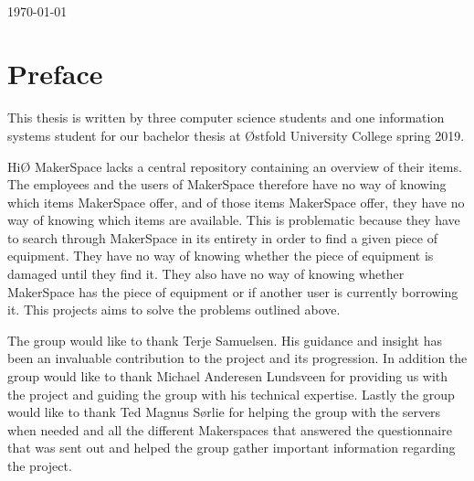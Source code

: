 \documentclass[12pt]{report}
\begin{document}
\begin{titlepage}
\begin{minipage}{0.8\textwidth}
\end{minipage}\\[2cm]



{\large \today}\\[2cm] %

\vfill %

\end{titlepage}

\makepresentationpage
{}


\chapter*{Preface}

This thesis is written by three computer science students and one information systems student for our bachelor thesis at Østfold University College spring 2019.

HiØ MakerSpace lacks a central repository containing an overview of their items.
The employees and the users of MakerSpace therefore have no way of knowing which items MakerSpace offer, and of those items MakerSpace offer, they have no way of knowing which items are available.
This is problematic because they have to search through MakerSpace in its entirety in order to find a given piece of equipment.
They have no way of knowing whether the piece of equipment is damaged until they find it.
They also have no way of knowing whether MakerSpace has the piece of equipment or if another user is currently borrowing it.
This projects aims to solve the problems outlined above.

The group would like to thank Terje Samuelsen.
His guidance and insight has been an invaluable contribution to the project and its progression. In addition the group would like to thank Michael Anderesen Lundsveen for providing us with the project and guiding the group with his technical expertise.
Lastly the group would like to thank Ted Magnus Sørlie for helping the group with the servers when needed and all the different Makerspaces that answered the questionnaire that was sent out and helped the group gather important information regarding the project.
\end{document}
